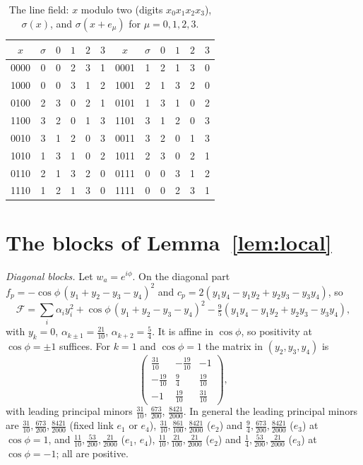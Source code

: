 \documentclass[11pt]{amsart}
\theoremstyle{definition}
\theoremstyle{remark}
\numberwithin{equation}{section}
\begin{document}
\begin{table}[h]
\caption{The line field: $x$ modulo two (digits $x_0x_1x_2x_3$), $\sigma(x)$, and
$\sigma(x+e_\mu)$ for $\mu=0,1,2,3$.}
\label{tab:sigma}
\begin{tabular}{cccccc|cccccc}
\toprule
$x$&$\sigma$&$0$&$1$&$2$&$3$&$x$&$\sigma$&$0$&$1$&$2$&$3$\\
\midrule
0000 & 0 & 0 & 2 & 3 & 1 & 0001 & 1 & 2 & 1 & 3 & 0 \\
1000 & 0 & 0 & 3 & 1 & 2 & 1001 & 2 & 1 & 3 & 2 & 0 \\
0100 & 2 & 3 & 0 & 2 & 1 & 0101 & 1 & 3 & 1 & 0 & 2 \\
1100 & 3 & 2 & 0 & 1 & 3 & 1101 & 3 & 1 & 2 & 0 & 3 \\
0010 & 3 & 1 & 2 & 0 & 3 & 0011 & 3 & 2 & 0 & 1 & 3 \\
1010 & 1 & 3 & 1 & 0 & 2 & 1011 & 2 & 3 & 0 & 2 & 1 \\
0110 & 2 & 1 & 3 & 2 & 0 & 0111 & 0 & 0 & 3 & 1 & 2 \\
1110 & 1 & 2 & 1 & 3 & 0 & 1111 & 0 & 0 & 2 & 3 & 1 \\
\bottomrule
\end{tabular}
\end{table}

\section{The blocks of Lemma~\ref{lem:local}}\label{app:blocks}

\emph{Diagonal blocks.} Let $w_a=e^{i\phi}$. On the diagonal part
$f_p=-\cos\phi\,(y_1+y_2-y_3-y_4)^2$ and $c_p=2(y_1y_4-y_1y_2+y_2y_3-y_3y_4)$, so
\[
\mathcal F=\sum_i\alpha_iy_i^2+\cos\phi\,(y_1+y_2-y_3-y_4)^2-\tfrac95(y_1y_4-y_1y_2
+y_2y_3-y_3y_4),
\]
with $y_k=0$, $\alpha_{k\pm1}=\frac{21}{10}$, $\alpha_{k+2}=\frac54$. It is affine in
$\cos\phi$, so positivity at $\cos\phi=\pm1$ suffices. For $k=1$ and $\cos\phi=1$
the matrix in $(y_2,y_3,y_4)$ is
\[
\begin{pmatrix}\frac{31}{10}&-\frac{19}{10}&-1\\[2pt]-\frac{19}{10}&\frac94&
\frac{19}{10}\\[2pt]-1&\frac{19}{10}&\frac{31}{10}\end{pmatrix},
\]
with leading principal minors $\frac{31}{10}$, $\frac{673}{200}$,
$\frac{8421}{2000}$. In general the leading principal minors are
$\frac{31}{10},\frac{673}{200},\frac{8421}{2000}$ (fixed link $e_1$ or $e_4$),
$\frac{31}{10},\frac{861}{100},\frac{8421}{2000}$ ($e_2$) and
$\frac94,\frac{673}{200},\frac{8421}{2000}$ ($e_3$) at $\cos\phi=1$, and
$\frac{11}{10},\frac{53}{200},\frac{21}{2000}$ ($e_1$, $e_4$),
$\frac{11}{10},\frac{21}{100},\frac{21}{2000}$ ($e_2$) and
$\frac14,\frac{53}{200},\frac{21}{2000}$ ($e_3$) at $\cos\phi=-1$; all are
positive.
\end{document}
